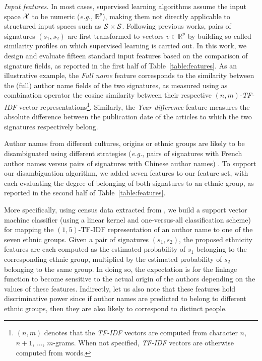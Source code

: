 \documentclass{article}
\newcommand{\eg}{\emph{e.g.}\xspace}
\begin{document}
\textit{Input features.} In most cases, supervised learning algorithms assume
the input space ${\cal X}$ to be numeric (\eg, $\mathbb{R}^p$), making them
not directly applicable to structured input spaces such as ${\cal S} \times
{\cal S}$.
Following previous works, pairs of signatures $(s_1, s_2)$ are first transformed to vectors $v \in \mathbb{R}^p$
by building so-called similarity profiles \citep{treeratpituk2009disambiguating} on which supervised learning is carried out.
In this work, we design and evaluate fifteen standard input
features based on the comparison of signature fields, as reported in the first
half of Table~\ref{table:features}.
As an illustrative example, the \textit{Full name} feature corresponds to the similarity between the (full)
author name fields of the two signatures, as measured using as combination
operator the cosine similarity between their respective $(n,m)$-\emph{TF-IDF} vector
representations\footnote{$(n,m)$ denotes that the \emph{TF-IDF} vectors are computed
from character $n$, $n+1$, ..., $m$-grams.
When not specified, \emph{TF-IDF} vectors are otherwise computed from words.}.
Similarly, the \textit{Year difference} feature measures the absolute difference between the publication date of the
articles to which the two signatures respectively belong.

Author names from different cultures, origins or ethnic groups are likely to be
disambiguated using different strategies (\eg, pairs of signatures with French
author names versus pairs of signatures with Chinese author names) \citep{treeratpituk2012name, chin2014effective}.
To support our disambiguation algorithm, we added seven features to our feature set, with each
evaluating the degree of belonging of both signatures to an ethnic group,
as reported in the second half of Table~\ref{table:features}.

More specifically, using census data extracted from \citep{rugglesintegrated},
we build a support vector machine classifier (using a linear kernel and
one-versus-all classification scheme) for mapping the
 $(1,5)$-TF-IDF representation of an author name to one of the seven ethnic groups. Given a
pair of signatures $(s_1, s_2)$, the proposed ethnicity features are each
computed as the estimated probability of $s_1$ belonging to the corresponding
ethnic group, multiplied by the estimated probability of $s_2$ belonging to the
same group. In doing so, the expectation is for the linkage function to become
sensitive to the actual origin of the authors depending on the values of these
features. Indirectly, let us also note that these features hold discriminative
power since if author names are predicted to belong to different ethnic groups,
then they are also likely to correspond to distinct people.
\end{document}
